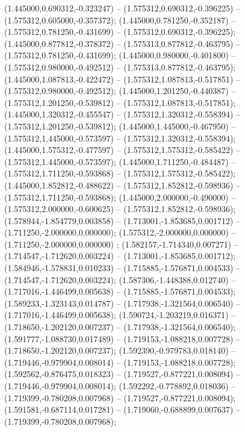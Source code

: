  (1.445000,0.690312,-0.323247) -- (1.575312,0.690312,-0.396225) -- (1.575312,0.605000,-0.357372);
 (1.445000,0.781250,-0.352187) -- (1.575312,0.781250,-0.431699) -- (1.575312,0.690312,-0.396225);
 (1.445000,0.877812,-0.378372) -- (1.575313,0.877812,-0.463795) -- (1.575312,0.781250,-0.431699);
 (1.445000,0.980000,-0.401800) -- (1.575312,0.980000,-0.492512) -- (1.575313,0.877812,-0.463795);
 (1.445000,1.087813,-0.422472) -- (1.575312,1.087813,-0.517851) -- (1.575312,0.980000,-0.492512);
 (1.445000,1.201250,-0.440387) -- (1.575312,1.201250,-0.539812) -- (1.575312,1.087813,-0.517851);
 (1.445000,1.320312,-0.455547) -- (1.575312,1.320312,-0.558394) -- (1.575312,1.201250,-0.539812);
 (1.445000,1.445000,-0.467950) -- (1.575312,1.445000,-0.573597) -- (1.575312,1.320312,-0.558394);
 (1.445000,1.575312,-0.477597) -- (1.575312,1.575312,-0.585422) -- (1.575312,1.445000,-0.573597);
 (1.445000,1.711250,-0.484487) -- (1.575312,1.711250,-0.593868) -- (1.575312,1.575312,-0.585422);
 (1.445000,1.852812,-0.488622) -- (1.575312,1.852812,-0.598936) -- (1.575312,1.711250,-0.593868);
 (1.445000,2.000000,-0.490000) -- (1.575312,2.000000,-0.600625) -- (1.575312,1.852812,-0.598936);
 (1.578944,-1.854779,0.003858) -- (1.713001,-1.853685,0.001712) -- (1.711250,-2.000000,0.000000);
 (1.575312,-2.000000,0.000000) -- (1.711250,-2.000000,0.000000) ;
 (1.582157,-1.714340,0.007271) -- (1.714547,-1.712620,0.003224) -- (1.713001,-1.853685,0.001712);
 (1.584946,-1.578831,0.010233) -- (1.715885,-1.576871,0.004533) -- (1.714547,-1.712620,0.003224);
 (1.587306,-1.448388,0.012740) -- (1.717016,-1.446499,0.005638) -- (1.715885,-1.576871,0.004533);
 (1.589233,-1.323143,0.014787) -- (1.717938,-1.321564,0.006540) -- (1.717016,-1.446499,0.005638);
 (1.590724,-1.203219,0.016371) -- (1.718650,-1.202120,0.007237) -- (1.717938,-1.321564,0.006540);
 (1.591777,-1.088730,0.017489) -- (1.719153,-1.088218,0.007728) -- (1.718650,-1.202120,0.007237);
 (1.592390,-0.979783,0.018140) -- (1.719446,-0.979904,0.008014) -- (1.719153,-1.088218,0.007728);
 (1.592562,-0.876475,0.018323) -- (1.719527,-0.877221,0.008094) -- (1.719446,-0.979904,0.008014);
 (1.592292,-0.778892,0.018036) -- (1.719399,-0.780208,0.007968) -- (1.719527,-0.877221,0.008094);
 (1.591581,-0.687114,0.017281) -- (1.719060,-0.688899,0.007637) -- (1.719399,-0.780208,0.007968);
